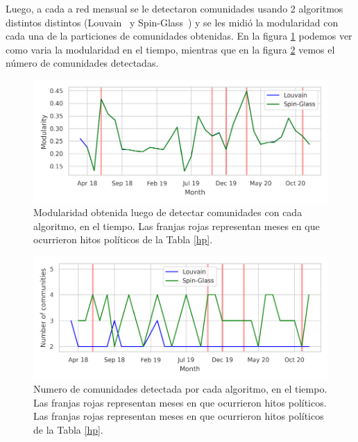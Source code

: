 \documentclass{proyectotesis}
\begin{document}
Luego, a cada a red mensual se le detectaron comunidades usando 2 algoritmos distintos distintos (Louvain~\cite{blondel_fast_2008} y Spin-Glass~\cite{reichardt_statistical_2006}) y se les midió la modularidad con cada una de la particiones de comunidades obtenidas. En la figura \ref{modfig} podemos ver como varia la modularidad en el tiempo, mientras que en la figura \ref{N} vemos el número de comunidades detectadas.\\
\begin{figure}[h!]
    \centering
    \includegraphics[width=0.95\linewidth]{mod.pdf} 
    \vspace{-5mm}
    \caption{Modularidad obtenida luego de detectar comunidades con cada algoritmo, en el tiempo. Las franjas rojas representan meses en que ocurrieron hitos políticos de la Tabla \ref{hp}.}
    \label{modfig}
\end{figure}
\begin{figure}[h!]
    \centering
    \includegraphics[width=0.95\linewidth]{N.pdf} 
    \vspace{-5mm}
    \caption{Numero de comunidades detectada por cada algoritmo, en el tiempo. Las franjas rojas representan meses en que ocurrieron hitos políticos. Las franjas rojas representan meses en que ocurrieron hitos políticos de la Tabla \ref{hp}.}
    \label{N}
\end{figure}

\renewcommand{\tablename}{Tabla}
\end{document}
